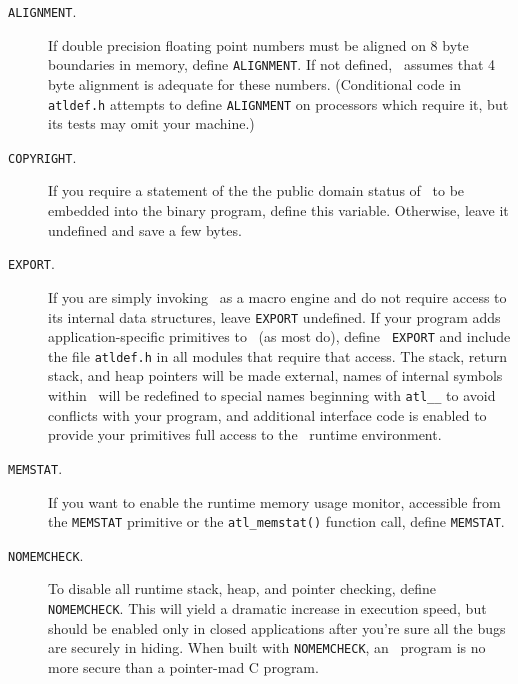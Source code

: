 \documentclass[twocolumn]{article}
\begin{document}
\begin{description}
\item[{\tt ALIGNMENT}.] If double precision floating point numbers
                    must be aligned on 8 byte boundaries in memory,
                    define {\tt ALIGNMENT}.  If not defined, \atlast\
                    assumes that 4 byte alignment is adequate for
                    these numbers.  (Conditional code in {\tt
                    atldef.h} attempts to define {\tt ALIGNMENT} on
                    processors which require it, but its tests may
                    omit your machine.)  \\
\item[{\tt COPYRIGHT}.]  If you require a statement of the the public
		    domain status of \atlast\ to be embedded into the
		    binary program, define this variable.  Otherwise,
		    leave it undefined and save a few bytes.
\item[{\tt EXPORT}.]  If you are simply invoking \atlast\ as a macro
                    engine and do not require access to its internal
                    data structures, leave {\tt EXPORT} undefined.  If
                    your program adds application-specific
                    primitives to \atlast\ (as most do), define {\tt
                    EXPORT} and include the file {\tt atldef.h} in
                    all modules that require that access.  The stack,
                    return stack, and heap pointers will be made
                    external, names of internal symbols within \atlast\
                    will be redefined to special names beginning with
                    \verb+atl__+ to avoid conflicts with your program,
                    and additional interface code is enabled to
                    provide your primitives full access to the \atlast\
                    runtime environment. \\
\item[{\tt MEMSTAT}.] If you want to enable the runtime memory usage
                    monitor, accessible from the {\tt MEMSTAT}
                    primitive or the \verb+atl_memstat()+ function
                    call, define {\tt MEMSTAT}. \\
\item[{\tt NOMEMCHECK}.] To disable all runtime stack, heap, and
                    pointer checking, define {\tt NOMEMCHECK}\@.  This
                    will yield a dramatic increase in execution speed,
                    but should be enabled only in closed applications
                    after you're sure all the bugs are securely in
                    hiding.  When built with {\tt NOMEMCHECK}, an
                    \atlast\ program is no more secure than a
                    pointer-mad C program.


\end{description}
\end{document}

